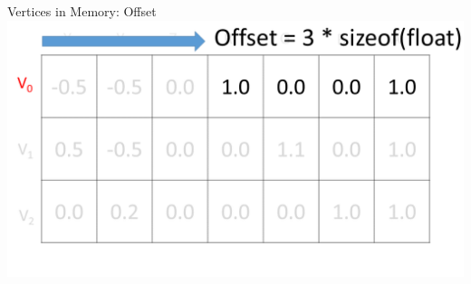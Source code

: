\begin{frame}{Vertices in Memory: Offset}
	\includegraphics[width=1\textwidth]{MemoryLayoutOffset}	
\end{frame}


